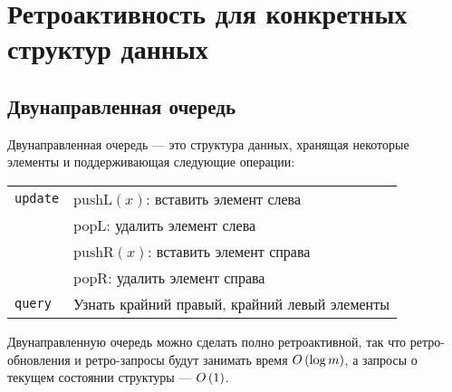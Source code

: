 \section{Ретроактивность для конкретных структур данных}
\subsection{Двунаправленная очередь}

Двунаправленная очередь — это структура данных, хранящая некоторые элементы и поддерживающая следующие операции:

\begin{center} \begin{tabular}{ll}
	{\tt update} & $\text{pushL} (x)$: вставить элемент слева \\
		& popL: удалить элемент слева \\
		& $\text{pushR} (x)$: вставить элемент справа \\
		& popR: удалить элемент справа \\
	{\tt query} & Узнать крайний правый, крайний левый элементы
\end{tabular} \end{center}

\begin{theorem} 
\label{thm:dequeue}
	Двунаправленную очередь можно сделать полно ретроактивной, так что ретро-обновления и ретро-запросы будут занимать время $O \left( \log m \right)$, а запросы о текущем состоянии структуры — $O \left( 1 \right)$.
\end{theorem}

